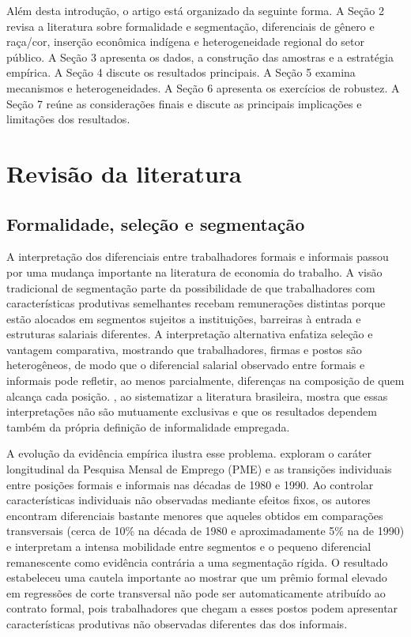\documentclass[12pt]{article}
\begin{document}
Além desta introdução, o artigo está organizado da seguinte forma. A Seção 2 revisa a 
literatura sobre formalidade e segmentação, diferenciais de gênero e raça/cor, inserção 
econômica indígena e heterogeneidade regional do setor público. A Seção 3 apresenta os 
dados, a construção das amostras e a estratégia empírica. A Seção 4 discute os resultados 
principais. A Seção 5 examina mecanismos e heterogeneidades. A Seção 6 apresenta os 
exercícios de robustez. A Seção 7 reúne as considerações finais e discute as principais 
implicações e limitações dos resultados.

\section{Revisão da literatura}
\label{sec:literatura}

\subsection{Formalidade, seleção e segmentação}

A interpretação dos diferenciais entre trabalhadores formais e informais passou por uma 
mudança importante na literatura de economia do trabalho. A visão tradicional de segmentação 
parte da possibilidade de que trabalhadores com características produtivas semelhantes 
recebam remunerações distintas porque estão alocados em segmentos sujeitos a instituições, 
barreiras à entrada e estruturas salariais diferentes. A interpretação alternativa enfatiza 
seleção e vantagem comparativa, mostrando que trabalhadores, firmas e postos são heterogêneos, de modo 
que o diferencial salarial observado entre formais e informais pode refletir, ao menos 
parcialmente, diferenças na composição de quem alcança cada posição. \citet{ulyssea2006}, 
ao sistematizar a literatura brasileira, mostra que essas interpretações não são mutuamente 
exclusivas e que os resultados dependem também da própria definição de informalidade empregada.

A evolução da evidência empírica ilustra esse problema. \citet{curi2006} exploram o caráter 
longitudinal da Pesquisa Mensal de Emprego (PME) e as transições individuais entre posições 
formais e informais nas décadas de 1980 e 1990. Ao controlar características individuais 
não observadas mediante efeitos fixos, os autores encontram diferenciais bastante menores 
que aqueles obtidos em comparações transversais (cerca de 10\% na década de 1980 e 
aproximadamente 5\% na de 1990) e interpretam a intensa mobilidade entre segmentos e o 
pequeno diferencial remanescente como evidência contrária a uma segmentação rígida. O 
resultado estabeleceu uma cautela importante ao mostrar que um prêmio formal elevado em regressões de 
corte transversal não pode ser automaticamente atribuído ao contrato formal, pois trabalhadores 
que chegam a esses postos podem apresentar características produtivas não observadas 
diferentes das dos informais.
\end{document}
